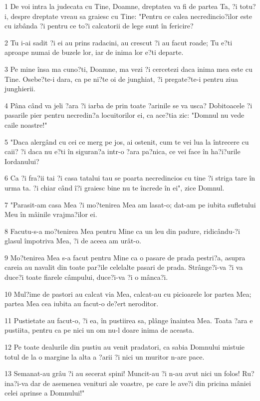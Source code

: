 \par 1 De voi intra la judecata cu Tine, Doamne, dreptatea va fi de partea Ta, ?i totu?i, despre dreptate vreau sa graiesc cu Tine: "Pentru ce calea necredincio?ilor este cu izbânda ?i pentru ce to?i calcatorii de lege sunt în fericire?
\par 2 Tu i-ai sadit ?i ei au prins radacini, au crescut ?i au facut roade; Tu e?ti aproape numai de buzele lor, iar de inima lor e?ti departe.
\par 3 Pe mine însa ma cuno?ti, Doamne, ma vezi ?i cercetezi daca inima mea este cu Tine. Osebe?te-i dara, ca pe ni?te oi de junghiat, ?i pregate?te-i pentru ziua junghierii.
\par 4 Pâna când va jeli ?ara ?i iarba de prin toate ?arinile se va usca? Dobitoacele ?i pasarile pier pentru necredin?a locuitorilor ei, ca ace?tia zic: "Domnul nu vede caile noastre!"
\par 5 "Daca alergând cu cei ce merg pe jos, ai ostenit, cum te vei lua la întrecere cu caii? ?i daca nu e?ti în siguran?a intr-o ?ara pa?nica, ce vei face în ha?i?urile Iordanului?
\par 6 Ca ?i fra?ii tai ?i casa tatalui tau se poarta necredincios cu tine ?i striga tare în urma ta. ?i chiar când î?i graiesc bine nu te încrede în ei", zice Domnul.
\par 7 "Parasit-am casa Mea ?i mo?tenirea Mea am lasat-o; dat-am pe iubita sufletului Meu în mâinile vrajma?ilor ei.
\par 8 Facutu-s-a mo?tenirea Mea pentru Mine ca un leu din padure, ridicându-?i glasul împotriva Mea, ?i de aceea am urât-o.
\par 9 Mo?tenirea Mea s-a facut pentru Mine ca o pasare de prada pestri?a, asupra careia au navalit din toate par?ile celelalte pasari de prada. Strânge?i-va ?i va duce?i toate fiarele câmpului, duce?i-va ?i o mânca?i.
\par 10 Mul?ime de pastori au calcat via Mea, calcat-au cu picioarele lor partea Mea; partea Mea cea iubita au facut-o de?ert neroditor.
\par 11 Pustietate au facut-o, ?i ea, în pustiirea sa, plânge înaintea Mea. Toata ?ara e pustiita, pentru ca pe nici un om nu-l doare inima de aceasta.
\par 12 Pe toate dealurile din pustiu au venit pradatori, ca sabia Domnului mistuie totul de la o margine la alta a ?arii ?i nici un muritor n-are pace.
\par 13 Semanat-au grâu ?i au secerat spini! Muncit-au ?i n-au avut nici un folos! Ru?ina?i-va dar de asemenea venituri ale voastre, pe care le ave?i din pricina mâniei celei aprinse a Domnului!"
